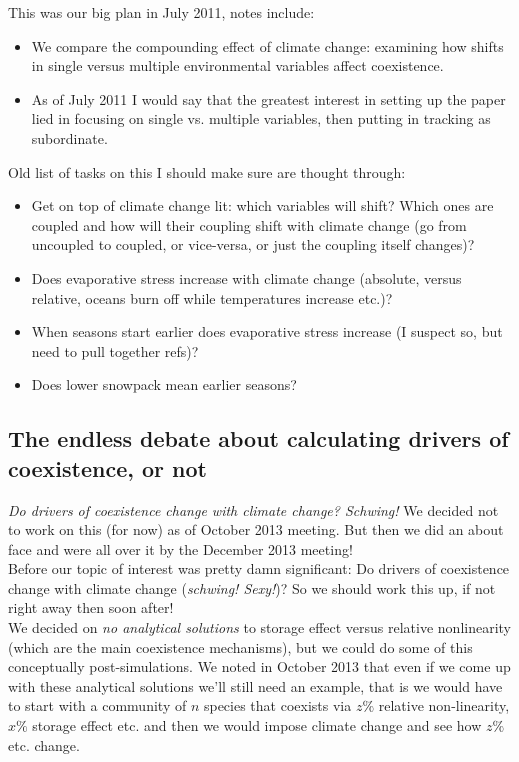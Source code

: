 \documentclass[11pt,a4paper,oneside]{article}
\begin{document}
This was our big plan in July 2011, notes include:\\
\begin{itemize}
\item We compare the compounding effect of climate change: examining
  how shifts in single versus multiple environmental variables affect
  coexistence.
\item As of July 2011 I would say that the greatest interest in setting up
the paper lied in focusing on single vs. multiple variables, then
putting in tracking as subordinate. 
\end{itemize}

\noindent Old list of tasks on this I should make sure are thought through:
\begin{itemize}
\item Get on top of climate change lit: which variables will shift?
  Which ones are coupled and how will their coupling shift with
  climate change (go from uncoupled to coupled, or vice-versa, or just
  the coupling itself changes)?
\item Does evaporative stress increase with climate change (absolute,
  versus relative, oceans burn off while temperatures increase etc.)?
\item When seasons start earlier does evaporative stress increase (I
  suspect so, but need to pull together refs)?
\item Does lower snowpack mean earlier seasons?
\end{itemize}

\subsection{The endless debate about calculating drivers of coexistence, or not}
\emph{Do drivers of coexistence change with climate change? Schwing!}
\noindent We decided not to work on this (for now) as of October 2013 meeting. But then we did an about face and were all over it by the December 2013 meeting!\\

 Before our topic of interest was pretty damn significant: Do drivers of coexistence change with climate change (\emph{schwing! Sexy!})? So we should work this up, if not right away then soon after!\\

We decided on \emph{no analytical solutions} to storage effect versus relative nonlinearity (which are the main coexistence mechanisms), but we could do some of this conceptually post-simulations. We noted in October 2013 that even if we come up with these analytical solutions we'll still need an example, that is we would have to start with a community of \(n\) species that coexists via \(z\%\) relative non-linearity, \(x\%\) storage effect etc. and then we would impose climate change and see how \(z\%\) etc. change.\\
\end{document}
